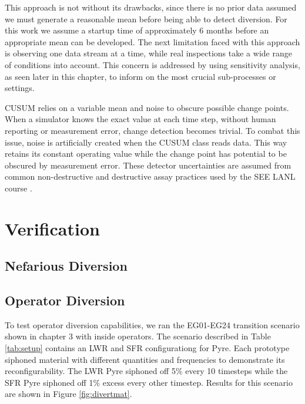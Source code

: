 This approach is not without its drawbacks, since there is no prior data assumed we must generate a reasonable mean before being able to detect diversion. For this work
we assume a startup time of approximately 6 months before an appropriate mean can be developed. The next limitation faced with this approach is observing one data stream at a time, while
real inspections take a wide range of conditions into account. This concern is addressed by using sensitivity analysis, as seen later in this chapter, to inform on the most crucial
sub-processes or settings. 

CUSUM relies on a variable mean and noise to obscure possible change points. When a simulator knows the exact value at each time step, without human reporting or measurement error, change 
detection becomes trivial. To combat this issue, noise is artificially created when the CUSUM class reads data. This way \Cyclus retains its constant operating value while the change point
has potential to be obscured by measurement error. These detector uncertainties are assumed from common non-destructive and destructive assay practices used by the SEE LANL course \cite{}.

\section{Verification}

\subsection{Nefarious Diversion}

\subsection{Operator Diversion}

To test operator diversion capabilities, we ran the EG01-EG24 transition scenario shown in chapter 3 with inside operators. The scenario described in Table \ref{tab:setup} contains an LWR and SFR configurationg for Pyre. Each prototype siphoned material with different quantities and frequencies to demonstrate its reconfigurability. The LWR Pyre siphoned off 5\% every 10 timesteps while the SFR Pyre siphoned off 1\% excess every other timestep.  Results for this scenario are shown in
Figure \ref{fig:divertmat}.

